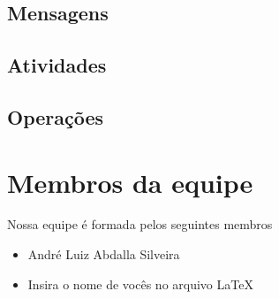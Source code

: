 \documentclass[11pt]{article}
\begin{document}
        \subsection{Mensagens}
        \subsection{Atividades}
        \subsection{Operações}

    \section[Equipe]{Membros da equipe}

    Nossa equipe é formada pelos seguintes membros
    \begin{itemize}
        \item André Luiz Abdalla Silveira
        \item Insira o nome de vocês no arquivo \LaTeX
    \end{itemize}
\end{document}
